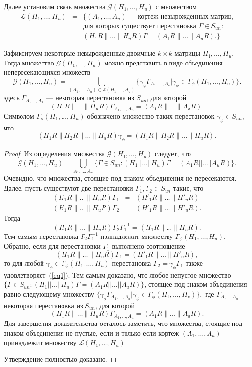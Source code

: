 Далее установим связь множества $\mathcal G(H_1,\ldots,H_u)$ с
множеством
\begin{eqnarray*}
\mathcal L(H_1,\ldots,H_u)&=&\{(A_1,\ldots,A_u)\text{ --- кортеж
невырожденных матриц,}\\
&&\text{для которых существует перестановка }\Gamma\in S_{un}:\\
&&(H_1R\|\ldots\|H_uR)\Gamma=(A_1R\|\ldots\|A_uR).\}
\end{eqnarray*}

\begin{proposition}
Зафиксируем некоторые невырожденные двоичные $k\times k$-матрицы
$H_1,\ldots,H_u$. Тогда множество $\mathcal G(H_1,\ldots,H_u)$
можно представить в виде объединения непересекающихся множеств
$$
\mathcal G(H_1,\ldots,H_u)=\bigcup_{(A_1,\ldots,A_u)\in\mathcal
L(H_1,\ldots,H_u)}\{\gamma_\phi\Gamma_{A_1,\ldots,A_u}|\gamma_\phi\in\Gamma_{\phi}(H_1,\ldots,H_u)\}.
$$
здесь $\Gamma_{A,\ldots,A_u}$ --- некоторая перестановка из
$S_{un}$, для которой
$$
(H_1R\|\ldots\|H_uR)\Gamma_{A_1,\ldots,A_u}=(A_1R\|\ldots\|A_uR).
$$
Символом $\Gamma_{\phi}(H_1,\ldots,H_u)$ обозначено множество таких перестановок \(\gamma_{\phi}\in S_{un},\) что
$$
(H_1R\|H_2R\|\ldots\|H_uR)\gamma_\phi=(H_1R\|H_2R\|\ldots\|H_uR).$$
\end{proposition}
\begin{proof}
Из определения множества $\mathcal G(H_1,\ldots,H_u)$ следует, что
$$
\mathcal G(H_1,\ldots,H_u)=\bigcup_{A_1,\ldots,A_u}\{\Gamma\in
S_{un}:(H_1||\ldots||H_u)\Gamma=(A_1R||\ldots||A_uR)\}.
$$
Очевидно, что множества, стоящие под знаком объединения не
пересекаются. Далее, пусть существуют две перестановки
$\Gamma_1,\Gamma_2\in S_{un}$ такие, что
\begin{eqnarray*}
(H_1R\|\ldots\|H_uR)\Gamma_1&=&(H'_1R\|\ldots\|H'_uR)\\
(H_1R\|\ldots\|H_uR)\Gamma_2&=&(H'_1R\|\ldots\|H'_uR).
\end{eqnarray*}
Тогда
$$
(H_1R\|\ldots\|H_uR)\Gamma_2\Gamma^{-1}_1=(H_1R\|\ldots\|H_uR).
$$
Тем самым перестановка $\Gamma_2\Gamma^{-1}_1$ принадлежит
множеству $\Gamma_{\phi}(H_1,\ldots,H_u)$. Обратно, если для
перестановки $\Gamma_1$ выполнено соотношение
\begin{equation}
\label{eq1} (H_1R\|\ldots\|H_uR)\Gamma_1=(H'_1R\|\ldots\|H'_uR),
\end{equation}
то для любой $\gamma_\phi\in\Gamma_{\phi}(H_1,\ldots,H_u)$
перестановка $\Gamma_2=\gamma_\phi\Gamma_1$ также
удовлетворяет~(\ref{eq1}). Тем самым доказано, что любое непустое
множество \(\{\Gamma\in
S_{un}:(H_1||\ldots||H_u)\Gamma=(A_1R||\ldots||A_uR)\}\), стоящее под знаком объединения равно следующему множеству
$
\{\gamma_\phi\Gamma_{A_1,\ldots,A_u}|\gamma_\phi\in\Gamma_{\phi}(H_1,\ldots,H_u)\},
$
где $\Gamma_{A,\ldots,A_u}$ --- некоторая перестановка из
$S_{un}$, для которой
$$
(H_1R\|\ldots\|H_uR)\Gamma_{A_1,\ldots,A_u}=(A_1R\|\ldots\|A_uR).
$$
Для завершения доказательства осталось заметить, что множества,
стоящие под знаком объединения не пустые, если и только если
кортеж $(A_1,\ldots,A_u)$ принадлежит множеству $\mathcal
L(H_1,\ldots,H_u)$.

Утверждение полностью доказано.
\end{proof}

